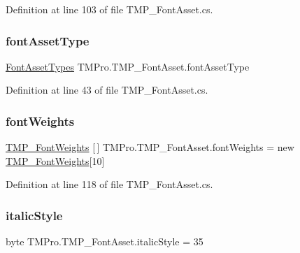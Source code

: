 Definition at line 103 of file T\+M\+P\+\_\+\+Font\+Asset.\+cs.

\mbox{\label{class_t_m_pro_1_1_t_m_p___font_asset_a288bea1979080ff0e8e1e2a6e47545dd}} 
\subsubsection{\texorpdfstring{fontAssetType}{fontAssetType}}
{\footnotesize\ttfamily \mbox{\hyperlink{class_t_m_pro_1_1_t_m_p___font_asset_a91155d493809b47bc2a9d38ffe43fca3}{Font\+Asset\+Types}} T\+M\+Pro.\+T\+M\+P\+\_\+\+Font\+Asset.\+font\+Asset\+Type}



Definition at line 43 of file T\+M\+P\+\_\+\+Font\+Asset.\+cs.

\mbox{\label{class_t_m_pro_1_1_t_m_p___font_asset_a9cd99822d0d3553f7e21dfa6a4cba2b0}} 
\subsubsection{\texorpdfstring{fontWeights}{fontWeights}}
{\footnotesize\ttfamily \mbox{\hyperlink{struct_t_m_pro_1_1_t_m_p___font_weights}{T\+M\+P\+\_\+\+Font\+Weights}} \mbox{[}$\,$\mbox{]} T\+M\+Pro.\+T\+M\+P\+\_\+\+Font\+Asset.\+font\+Weights = new \mbox{\hyperlink{struct_t_m_pro_1_1_t_m_p___font_weights}{T\+M\+P\+\_\+\+Font\+Weights}}\mbox{[}10\mbox{]}}



Definition at line 118 of file T\+M\+P\+\_\+\+Font\+Asset.\+cs.

\mbox{\label{class_t_m_pro_1_1_t_m_p___font_asset_aa444303f26f16cd2435a4dee25b9f9d5}} 
\subsubsection{\texorpdfstring{italicStyle}{italicStyle}}
{\footnotesize\ttfamily byte T\+M\+Pro.\+T\+M\+P\+\_\+\+Font\+Asset.\+italic\+Style = 35}



